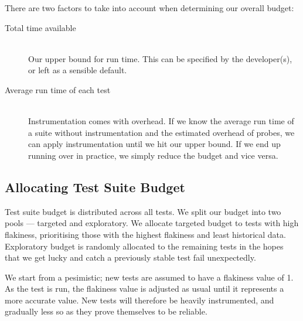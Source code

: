 There are two factors to take into account when determining our overall budget:

\begin{description}
	\item[Total time available] \hfill \\
 		Our upper bound for run time. This can be specified by the developer(s), or left as a sensible default.
	\item[Average run time of each test] \hfill \\
		Instrumentation comes with overhead. If we know the average run time of a suite without instrumentation and the estimated overhead of probes, we can apply instrumentation until we hit our upper bound. If we end up running over in practice, we simply reduce the budget and vice versa.
\end{description}


\subsection{Allocating Test Suite Budget}
\label{sec:sec:allocating_budget}

Test suite budget is distributed across all tests. We split our budget into two pools --- targeted and exploratory. We allocate targeted budget to tests with high flakiness, prioritising those with the highest flakiness and least historical data. Exploratory budget is randomly allocated to the remaining tests in the hopes that we get lucky and catch a previously stable test fail unexpectedly.

We start from a pesimistic; new tests are assumed to have a flakiness value of 1. As the test is run, the flakiness value is adjusted as usual until it represents a more accurate value. New tests will therefore be heavily instrumented, and gradually less so as they prove themselves to be reliable.

